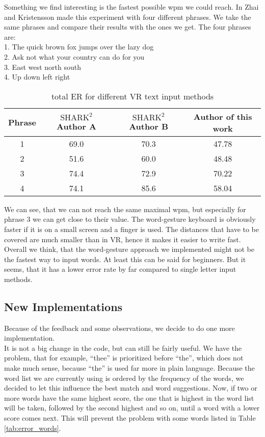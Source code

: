 Something we find interesting is the fastest possible wpm we could reach. In \cite{Kristensson2004SHARK2AL} Zhai and Kristensson made this experiment with four different phrases. We take the same phrases and compare their results with the ones we get. The four phrases are:\\
1. The quick brown fox jumps over the lazy dog\\
2. Ask not what your country can do for you\\
3. East west north south\\
4. Up down left right\\

\begin{table}[H]
    \centering
    \caption{total ER for different VR text input methods}
    \begin{tabular}{cccc} \toprule
        Phrase&$\text{SHARK}^2$ Author A&$\text{SHARK}^2$ Author B&Author of this work\\ \midrule
        1&69.0&70.3&47.78\\
        2&51.6&60.0&48.48\\
        3&74.4&72.9&70.22\\
        4&74.1&85.6&58.04\\
        \bottomrule
    \end{tabular}
    \label{tab:error_backspace_compare}
\end{table}
We can see, that we can not reach the same maximal wpm, but especially for phrase 3 we can get close to their value. The word-gesture keyboard is obviously faster if it is on a small screen and a finger is used. The distances that have to be covered are much smaller than in VR, hence it makes it easier to write fast.\\

Overall we think, that the word-gesture approach we implemented might not be the fastest way to input words. At least this can be said for beginners. But it seems, that it has a lower error rate by far compared to single letter input methods.

\subsection{New Implementations}
Because of the feedback and some observations, we decide to do one more implementation.\\
It is not a big change in the code, but can still be fairly useful. We have the problem, that for example, ``thee'' is prioritized before ``the'', which does not make much sense, because ``the'' is used far more in plain language. Because the word list we are currently using is ordered by the frequency of the words, we decided to let this influence the best match and word suggestions. Now, if two or more words have the same highest score, the one that is highest in the word list will be taken, followed by the second highest and so on, until a word with a lower score comes next. This will prevent the problem with some words listed in Table \ref{tab:error_words}.